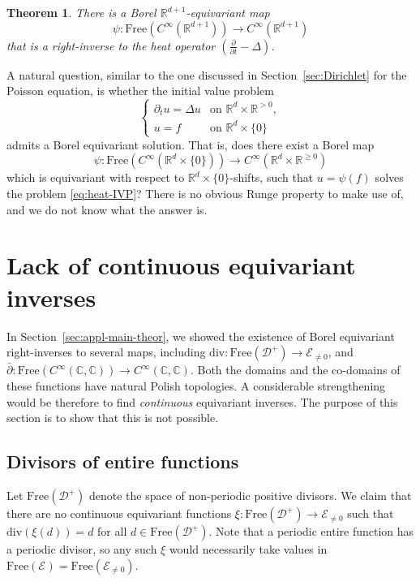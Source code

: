\documentclass[12pt]{paper}
\numberwithin{equation}{section}
\theoremstyle{plain}
\newtheorem{theorem}{Theorem}[section]
\theoremstyle{definition}
\newcommand{\C}{\mathbb{C}}
\newcommand{\R}{\mathbb{R}}
\newcommand{\Rd}{\mathbb{R}^{d}}
\newcommand{\smooth}[2][]{C^{\infty}_{#1}(#2)}
\newcommand{\holom}[1][]{\mathcal{E}_{#1}}
\newcommand{\divis}[1][]{\mathcal{D}_{#1}}
\newcommand{\divisp}[1][]{\divis[#1]^{+}}
\newcommand{\dm}{\mathrm{div}}      %
\newcommand{\free}{\mathrm{Free}}
\begin{document}
\begin{theorem}
  \label{thm:equivariant-heat}
  There is a Borel \(\R^{d+1}\)-equivariant map
  \[\psi : \free(\smooth{\R^{d+1}}) \to \smooth{\R^{d+1}}\]
  that is a right-inverse to the heat operator \((\frac{\partial}{\partial t} - \Delta) \).
\end{theorem}

A natural question, similar to the one discussed in Section~\ref{sec:Dirichlet} for the Poisson
equation, is whether the initial value problem
\begin{equation}
  \label{eq:heat-IVP}
  \begin{cases}
    \partial_t u=\Delta u & \text{on } \Rd\times\R^{>0},\\
    u=f&\text{on }\Rd\times\{0\}
  \end{cases}
\end{equation}
admits a Borel equivariant solution. That is, does there exist a Borel map
\[
  \psi: \free(C^\infty(\Rd\times\{0\}))\to C^\infty(\Rd\times\R^{\ge 0})
\]
which is equivariant with respect to \(\Rd\times\{0\}\)-shifts, such that \(u=\psi(f)\) solves the
problem \eqref{eq:heat-IVP}?  There is no obvious Runge property to make use of, and we do not know
what the answer is.




\section{Lack of continuous equivariant inverses}
\label{sec:continuous-inverses}
In Section~\ref{sec:appl-main-theor}, we showed the existence of Borel equivariant right-inverses to
several maps, including \(\dm : \free(\divisp) \to \holom[\ne 0]\), and
\(\bar{\partial} : \free(C^{\infty}(\C,\C)) \to C^{\infty}(\C,\C)\). Both the domains and the
co-domains of these functions have natural Polish topologies.  A considerable strengthening would be
therefore to find \emph{continuous} equivariant inverses.  The purpose of this section is to show
that this is not possible.

\subsection{Divisors of entire functions}
\label{sec:no-cont-equiv-dvs}

Let \(\free(\divisp)\) denote the space of non-periodic positive divisors.  We claim that there are
no continuous equivariant functions \(\xi : \free(\divisp) \to \holom[\ne 0]\) such that
\(\dm(\xi(d)) = d\) for all \(d \in \free(\divisp)\).  Note that a periodic entire function has a
periodic divisor, so any such \(\xi\) would necessarily take values in
\(\free(\holom) = \free(\holom[\ne 0])\).
\end{document}
